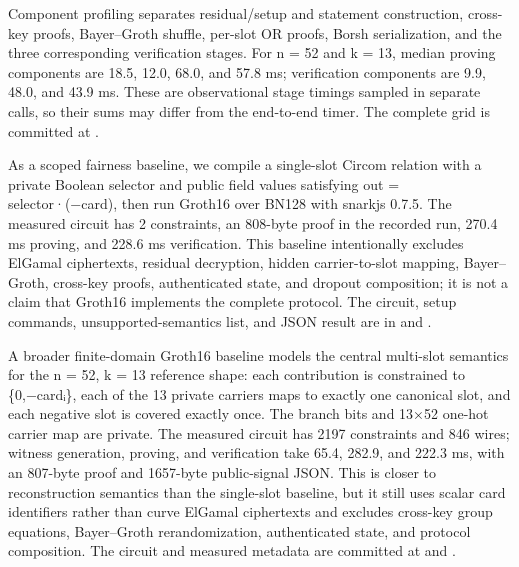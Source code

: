 \documentclass[11pt]{article}
\begin{document}
Component profiling separates residual/setup and statement construction, cross-key proofs, Bayer–Groth shuffle, per-slot OR proofs, Borsh serialization, and the three corresponding verification stages. For n = 52 and k = 13, median proving components are 18.5, 12.0, 68.0, and 57.8 ms; verification components are 9.9, 48.0, and 43.9 ms. These are observational stage timings sampled in separate calls, so their sums may differ from the end-to-end timer. The complete grid is committed at .

As a scoped fairness baseline, we compile a single-slot Circom relation with a private Boolean selector and public field values satisfying out = selector·(−card), then run Groth16 over BN128 with snarkjs 0.7.5. The measured circuit has 2 constraints, an 808-byte proof in the recorded run, 270.4 ms proving, and 228.6 ms verification. This baseline intentionally excludes ElGamal ciphertexts, residual decryption, hidden carrier-to-slot mapping, Bayer–Groth, cross-key proofs, authenticated state, and dropout composition; it is not a claim that Groth16 implements the complete protocol. The circuit, setup commands, unsupported-semantics list, and JSON result are in  and .

A broader finite-domain Groth16 baseline models the central multi-slot semantics for the n = 52, k = 13 reference shape: each contribution is constrained to \{0,−cardᵢ\}, each of the 13 private carriers maps to exactly one canonical slot, and each negative slot is covered exactly once. The branch bits and 13×52 one-hot carrier map are private. The measured circuit has 2197 constraints and 846 wires; witness generation, proving, and verification take 65.4, 282.9, and 222.3 ms, with an 807-byte proof and 1657-byte public-signal JSON. This is closer to reconstruction semantics than the single-slot baseline, but it still uses scalar card identifiers rather than curve ElGamal ciphertexts and excludes cross-key group equations, Bayer–Groth rerandomization, authenticated state, and protocol composition. The circuit and measured metadata are committed at  and .
\end{document}
